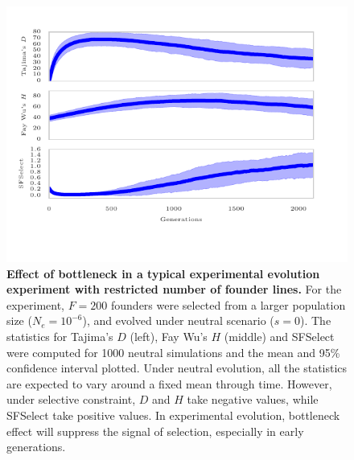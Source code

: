 \begin{figure}[H]
	\centering 
	\includegraphics[trim=3.2in 0.1in 3.2in 0.2in , 
	clip,width=\textwidth]{figures/bottleneck}
	\caption{{\bf Effect of bottleneck in a typical experimental
			evolution experiment with restricted number of founder
			lines.} For the experiment, $F=200$ founders were selected
		from a larger population size ($N_e=10^{-6}$), and evolved
		under neutral scenario ($s=0$). The statistics for
		Tajima's $D$ (left), Fay Wu's $H$ (middle) and SFSelect were
		computed for 1000 neutral simulations and the mean and 95\%
		confidence interval plotted. Under neutral evolution, all
		the statistics are expected to vary around a fixed mean
		through time. However, under selective constraint, $D$ and
		$H$ take negative values, while SFSelect take positive
		values. In experimental evolution, bottleneck effect will
		suppress the signal of selection, especially in early
		generations. }
	\label{fig:bottleneck}
\end{figure}

